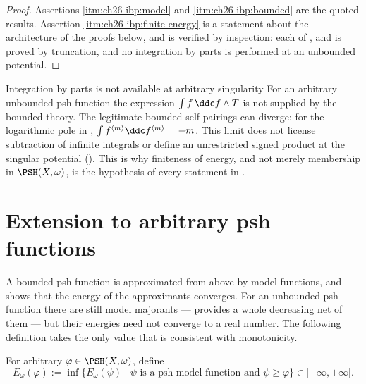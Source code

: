 \begin{proof}
Assertions \cref{itm:ch26-ibp:model} and \cref{itm:ch26-ibp:bounded} are the
quoted results.  Assertion \cref{itm:ch26-ibp:finite-energy} is a statement
about the architecture of the proofs below, and is verified by inspection:
each of ,
 and
 is proved by truncation, and no
integration by parts is performed at an unbounded potential.
\end{proof}

\begin{warning}{Integration by parts is not available at arbitrary
singularity}
For an arbitrary unbounded psh function the expression
$\int f\,\ddc f\wedge T$ is not supplied by the bounded theory.
The legitimate bounded self-pairings can diverge: for the logarithmic pole
in ,
$\int f^{\langle m\rangle}\ddc f^{\langle m\rangle}=-m$.
This limit does not license subtraction of infinite integrals or define
an unrestricted signed product at the singular potential
().  This is why finiteness of energy, and not merely
membership in $\PSH(X,\omega)$, is the hypothesis of every statement in
.
\end{warning}

\section{Extension to arbitrary psh functions}
\label{sec:ch26-extension}

A bounded psh function is approximated from above by model functions, and
 shows that the energy of the
approximants converges.  For an unbounded psh function there are still model
majorants ---  provides a whole
decreasing net of them --- but their energies need not converge to a real
number.  The following definition takes the only value that is consistent
with monotonicity.

\begin{definition}
\label{def:extended-energy}
For arbitrary $\varphi\in\PSH(X,\omega)$, define
\begin{equation}
\label{eq:extended-energy}
 E_\omega(\varphi):=
 \inf\{E_\omega(\psi)\mid
       \psi\text{ is a psh model function and }\psi\geq\varphi\}
 \in[-\infty,+\infty[.
\end{equation}
\end{definition}

